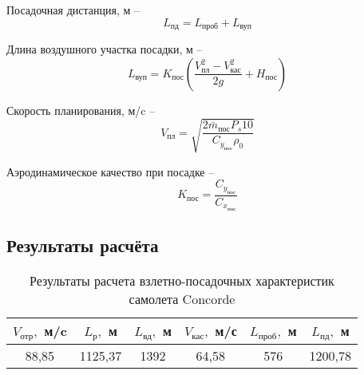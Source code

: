 Посадочная дистанция, м -- 
\begin{equation}
    \label{eq:Посадочная дистанция}
    L_\text{пд} = L_\text{проб} + L_\text{вуп}
\end{equation}

Длина воздушного участка посадки, м -- 
\begin{equation}
    \label{eq:Длина воздушного участка посадки}
        L_\text{вуп} = K_\text{пос}(\frac{V_\text{пл}^2-V^2_\text{кас}}{2g}+H_\text{пос})
\end{equation}
 
 Скорость планирования, м/c -- 
 \begin{equation}
     \label{eq:Скорость планирования}
     V_\text{пл} = \sqrt{\frac{2\bar{m}_\text{пос}P_s10}{C_{y_\text{пос}}\rho_0}}
 \end{equation}
 
 Аэродинамическое качество при посадке -- 
 \begin{equation}
     \label{eq:Аэродинамическое качество при посадке}
     K_\text{пос} = \frac{C_{y_\text{пос}}}{C_{x_\text{пос}}}
 \end{equation}
 
 \subsection{Результаты расчёта}
 
 \begin{table}[H]
     \centering
     \caption{Результаты расчета взлетно-посадочных характеристик самолета Concorde}
     \begin{tabular}{|c|c|c|c|c|c|}
     \hline
          $V_\text{отр}, $ м/c& $L_\text{р},$ м & $L_\text{вд},$ м& $V_\text{кас},$ м/с  &$L_\text{проб},$ м  &$L_\text{пд},$ м\\ \hline
          88,85& 1125,37 & 1392 & 64,58 & 576 &1200,78\\ \hline
     \end{tabular}
     \label{tab:my_label}
 \end{table}


  
